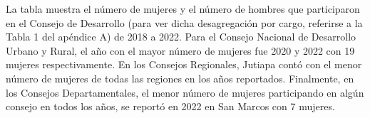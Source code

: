 La tabla muestra el número de mujeres y el número de hombres que participaron en el Consejo de Desarrollo (para ver dicha desagregación por cargo, referirse a la Tabla 1 del apéndice A) de  2018 a 2022. Para el Consejo Nacional de Desarrollo Urbano y Rural, el año con el mayor número de mujeres fue 2020 y 2022 con 19 mujeres respectivamente. En los Consejos Regionales, Jutiapa contó con el menor número de mujeres de todas las regiones en los años reportados. Finalmente, en los Consejos Departamentales, el menor número de mujeres participando en algún consejo en todos los años, se reportó en 2022 en San Marcos con 7 mujeres. 
